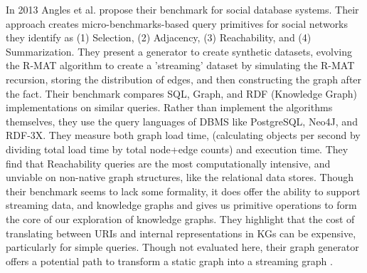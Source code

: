 \par{In 2013 Angles et al. propose their benchmark for social database systems. 
Their approach creates micro-benchmarks-based query primitives for social networks they identify as (1) Selection, (2) Adjacency, (3) Reachability, and (4) Summarization. 
They present a generator to create synthetic datasets, evolving the R-MAT algorithm to create a 'streaming' dataset by simulating the R-MAT recursion, storing the distribution of edges, and then constructing the graph after the fact. 
Their benchmark compares SQL, Graph, and RDF (Knowledge Graph) implementations on similar queries. 
Rather than implement the algorithms themselves, they use the query languages of DBMS like PostgreSQL, Neo4J, and RDF-3X.
They measure both graph load time, (calculating objects per second by dividing total load time by total node+edge counts) and execution time. 
They find that Reachability queries are the most computationally intensive, and unviable on non-native graph structures, like the relational data stores. 
Though their benchmark seems to lack some formality, it does offer the ability to support streaming data, and knowledge graphs and gives us primitive operations to form the core of our exploration of knowledge graphs. They highlight that the cost of translating between URIs and internal representations in KGs can be expensive, particularly for simple queries. 
Though not evaluated here, their graph generator offers a potential path to transform a static graph into a streaming graph \cite{Angles2013}.}

